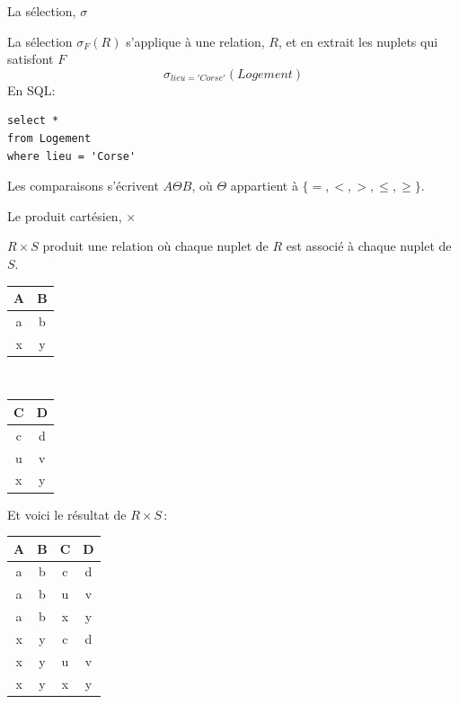 \begin{frame}[fragile]{La sélection, $\sigma$}

La sélection $\sigma_F(R)$ s'applique à une relation, $R$, et
en extrait les nuplets qui satisfont $F$
$$\sigma_{lieu='Corse'}(Logement)$$
\vfill
En SQL: 

\begin{verbatim}
select * 
from Logement
where lieu = 'Corse'
\end{verbatim}

\vfill

\begin{blocgauche}
Les comparaisons s'écrivent
$A \Theta B$, où $\Theta$ appartient
à $\{=, <, >, \leq, \geq\}$.
\end{blocgauche}
\end{frame}


\begin{frame}[fragile]{Le produit cartésien, $\times$}

$R \times S$ produit 
une relation où chaque nuplet de $R$ est associé
à chaque nuplet de $S$.

\vfill

\begin{minipage}[t]{6cm}
\begin{center}
\begin{tabular}{c|c}
A & B \\ \hline
a & b  \\
x & y  \\\hline 
\end{tabular}
\end{center}
\end{minipage} \
\begin{minipage}[t]{6cm}
\begin{center}
\begin{tabular}{c|c}
C & D \\ \hline
c & d  \\ 
u & v  \\
x & y  \\\hline 
\end{tabular}
\end{center}
\end{minipage} 

\vfill


Et voici le résultat de $R \times S$\,:

\begin{center}
\begin{tabular}{c|c|c|c}
A & B & C & D \\ \hline
a & b & c & d  \\ 
a & b & u & v \\
a & b & x & y \\
x & y & c & d  \\ 
x & y & u & v \\
x & y & x & y \\\hline
\end{tabular}
\end{center}

\end{frame}


